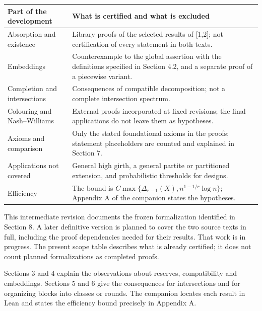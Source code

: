 \documentclass[english,11pt,a4paper]{article}
\begin{document}
{\begin{longtable}[]{@{}
  >{\raggedright\arraybackslash}p{}
  >{\raggedright\arraybackslash}p{}@{}}
\toprule\noalign{}
\begin{minipage}[b]{\linewidth}\raggedright
Part of the development
\end{minipage} & \begin{minipage}[b]{\linewidth}\raggedright
What is certified and what is excluded
\end{minipage} \\
\midrule\noalign{}
\endhead
\bottomrule\noalign{}
\endlastfoot
Absorption and existence & Library proofs of the selected results of {[}1,2{]}; not certification of every statement in both texts. \\
Embeddings & Counterexample to the global assertion with the definitions specified in Section 4.2, and a separate proof of a piecewise variant. \\
Completion and intersections & Consequences of compatible decomposition; not a complete intersection spectrum. \\
Colouring and Nash--Williams & External proofs incorporated at fixed revisions; the final applications do not leave them as hypotheses. \\
Axioms and comparison & Only the stated foundational axioms in the proofs; statement placeholders are counted and explained in Section 7. \\
Applications not covered & General high girth, a general partite or partitioned extension, and probabilistic thresholds for designs. \\
Efficiency & The bound is \(C\max\{\Delta_{r-1}(X),n^{1-1/r}\log n\}\); Appendix A of the companion states the hypotheses. \\
\end{longtable}
}

This intermediate revision documents the frozen formalization identified in Section 8. A later definitive version is planned to cover the two source texts in full, including the proof dependencies needed for their results. That work is in progress. The present scope table describes what is already certified; it does not count planned formalizations as completed proofs.

Sections 3 and 4 explain the observations about reserves, compatibility and embeddings. Sections 5 and 6 give the consequences for intersections and for organizing blocks into classes or rounds. The companion locates each result in Lean and states the efficiency bound precisely in Appendix A.
\end{document}
